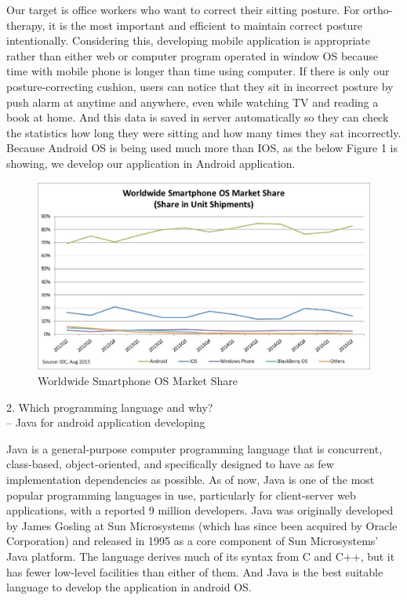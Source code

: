 \documentclass[conference]{IEEEtran}
\begin{document}
Our target is office workers who want to correct their sitting posture. For ortho-therapy, it is the most important and efficient to maintain correct posture intentionally. Considering this, developing mobile application is appropriate rather than either web or computer program operated in window OS because time with mobile phone is longer than time using computer. If there is only our posture-correcting cushion, users can notice that they sit in incorrect posture by push alarm at anytime and anywhere, even while watching TV and reading a book at home. And this data is saved in server automatically so they can check the statistics how long they were sitting and how many times they sat incorrectly. Because Android OS is being used much more than IOS, as the below Figure 1 is showing, we develop our application in Android application.

\begin{figure}[htbp]
\begin{center}
    \includegraphics[scale=0.4]{img_03.png}
    \caption{Worldwide Smartphone OS Market Share} 
\end{center}
\end{figure}

2.	Which programming language and why?\\

-- Java for android application developing

Java is a general-purpose computer programming language that is concurrent, class-based, object-oriented, and specifically designed to have as few implementation dependencies as possible. As of now, Java is one of the most popular programming languages in use, particularly for client-server web applications, with a reported 9 million developers. Java was originally developed by James Gosling at Sun Microsystems (which has since been acquired by Oracle Corporation) and released in 1995 as a core component of Sun Microsystems' Java platform. The language derives much of its syntax from C and C++, but it has fewer low-level facilities than either of them. And Java is the best suitable language to develop the application in android OS.\\
\end{document}
